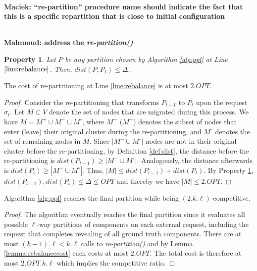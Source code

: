 \documentclass[manuscript,screen=true]{acmart}
\newtheorem{property}{Property}
\newcommand\mahmoud[1]{\color{green}\textbf{\\ Mahmoud: #1}\\\color{black}}
\newcommand\maciek[1]{\color{brown}\textbf{\\ Maciek: #1}\color{black}}
\begin{document}
      \maciek{``re-partition'' procedure name should indicate the fact that this is a specific repartition that is close to initial configuration}

\mahmoud{address the \textit{re-partition()}}

\begin{property} \label{prop:dist<OPT}
    Let $P$ be any partition chosen by Algorithm \ref{alg:ppl} at Line $\ref{line:rebalance}$.
    Then, $dist(P,P_I) \leq \Delta$.
\end{property}

\begin{lemma}	\label{lemma:rebalancecost}
    The cost of re-partitioning at Line \ref{line:rebalance} is at most $2.OPT$.
\end{lemma}
\begin{proof}
    Consider the re-partitioning that transforms $P_{t-1}$ to $P_t$ upon the request $\sigma_t$.
    Let $M \subset V$ denote the set of nodes that are migrated during this process.
    We have $M = M^+ \cup M^- \cup M^\circ$,
    where $M^-$ ($M^+$) denotes the subset of nodes that
    enter (leave) their original cluster during the re-partitioning,
    and $M^\circ$ denotes the set of remaining nodes in $M$.
    Since $|M^- \cup M^\circ|$ nodes are not in their original cluster before the re-partitioning,
    by Definition \ref{def:dist},
    the distance before the re-partitioning is $dist(P_{t-1}) \geq | M^- \cup M^\circ |$.
    Analogously,
     the distance afterwards is $dist(P_{t}) \geq | M^+ \cup M^\circ |$.
    Thus,
    $|M| \leq dist(P_{t-1}) + dist(P_{t})$.
    By Property \ref{prop:dist<OPT},
    $dist(P_{t-1}) , dist(P_{t}) \leq \Delta \leq OPT$
    and thereby we have	
    $|M| \leq 2.OPT$.
\end{proof}

\begin{theorem}	\label{thm:upperbound}
    Algorithm \ref{alg:ppl} reaches the final partition while being $(2.k.\ell)$-competitive.
\end{theorem}
\begin{proof}
    The algorithm eventually reaches the final partition since it
     evaluates all possible $\ell$-way partitions of components on each external request,
    including the request that completes revealing of all ground truth components.
    There are at most $(k-1).\ell < k.\ell $ calls to \emph{re-partition()} and by Lemma \ref{lemma:rebalancecost} each costs at most $2.OPT$.
    The total cost is therefore at most $2.OPT.k.\ell$ which implies the competitive ratio.
      \end{proof}
\end{document}
